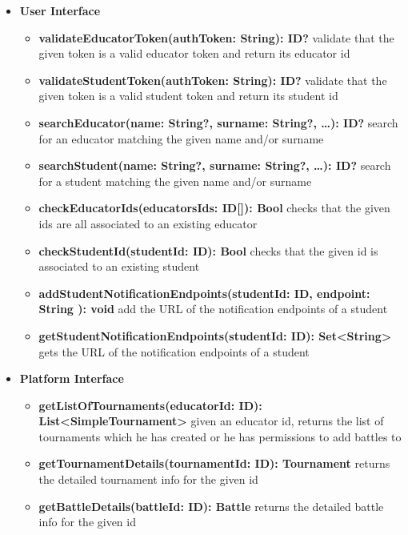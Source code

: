 \begin{itemize}
    \item \textbf{User Interface}
          \begin{itemize}
              \item \textbf{validateEducatorToken(authToken: String): ID?}
                    validate that the given token is a valid educator token and return its educator id
              \item \textbf{validateStudentToken(authToken: String): ID?}
                    validate that the given token is a valid student token and return its student id
              \item \textbf{searchEducator(name: String?, surname: String?, \ldots): ID?}
                    search for an educator matching the given name and/or surname
              \item \textbf{searchStudent(name: String?, surname: String?, \ldots): ID?}
                    search for a student matching the given name and/or surname
              \item \textbf{checkEducatorIds(educatorsIds: ID[]): Bool}
                    checks that the given ids are all associated to an existing educator
              \item \textbf{checkStudentId(studentId: ID): Bool}
                    checks that the given id is associated to an existing student
              \item \textbf{addStudentNotificationEndpoints(studentId: ID, endpoint: String ): void}
                    add the URL of the notification endpoints of a student
              \item \textbf{getStudentNotificationEndpoints(studentId: ID): Set<String>}
                    gets the URL of the notification endpoints of a student
          \end{itemize}
    \item \textbf{Platform Interface}
          \begin{itemize}
              \item \textbf{getListOfTournaments(educatorId: ID): List<SimpleTournament>}
                    given an educator id, returns the list of tournaments which he has created
                    or he has permissions to add battles to
              \item \textbf{getTournamentDetails(tournamentId: ID): Tournament}
                    returns the detailed tournament info for the given id
              \item \textbf{getBattleDetails(battleId: ID): Battle}
                    returns the detailed battle info for the given id

\end{itemize}
\end{itemize}
